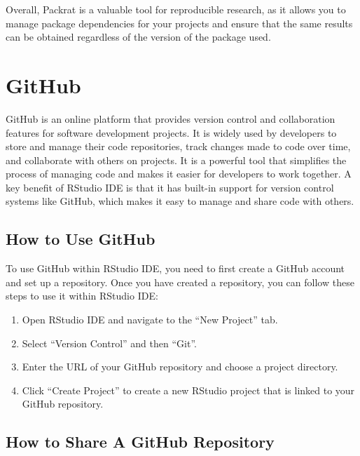 \documentclass[
]{book}
\providecommand{\tightlist}{%
  \setlength{\itemsep}{0pt}\setlength{\parskip}{0pt}}
\begin{document}
Overall, Packrat is a valuable tool for reproducible research, as it allows you to manage package dependencies for your projects and ensure that the same results can be obtained regardless of the version of the package used.

\hypertarget{github}{%
\section{GitHub}\label{github}}

GitHub is an online platform that provides version control and collaboration features for software development projects. It is widely used by developers to store and manage their code repositories, track changes made to code over time, and collaborate with others on projects. It is a powerful tool that simplifies the process of managing code and makes it easier for developers to work together. A key benefit of RStudio IDE is that it has built-in support for version control systems like GitHub, which makes it easy to manage and share code with others.

\hypertarget{how-to-use-github}{%
\subsection*{How to Use GitHub}\label{how-to-use-github}}

To use GitHub within RStudio IDE, you need to first create a GitHub account and set up a repository. Once you have created a repository, you can follow these steps to use it within RStudio IDE:

\begin{enumerate}
\def\labelenumi{\arabic{enumi}.}
\tightlist
\item
  Open RStudio IDE and navigate to the ``New Project'' tab.
\item
  Select ``Version Control'' and then ``Git''.
\item
  Enter the URL of your GitHub repository and choose a project directory.
\item
  Click ``Create Project'' to create a new RStudio project that is linked to your GitHub repository.
\end{enumerate}

\hypertarget{how-to-share-a-github-repository}{%
\subsection*{How to Share A GitHub Repository}\label{how-to-share-a-github-repository}}
\end{document}
